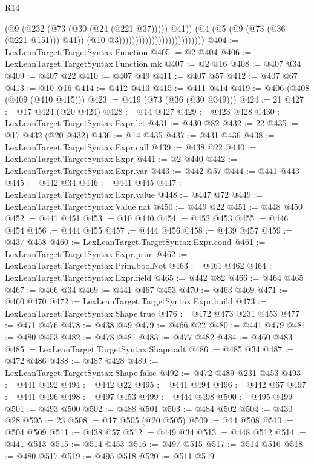 \begin{lexlean}{R14}
\begin{coremodule}
                                                      (@9 (@232 (@73 (@30 (@24 (@221 @37))))) @41))
                                                    (@4
                                                      (@5 (@9 (@73 (@36 (@221 @151))) @41))
                                                      (@10 @3))))))))))))))))))))))))))
@404 := LexLeanTarget.TargetSyntax.Function
@405 := @2 @404
@406 := LexLeanTarget.TargetSyntax.Function.mk
@407 := @2 @16
@408 := @407 @34
@409 := @407 @22
@410 := @407 @49
@411 := @407 @57
@412 := @407 @67
@413 := @10 @16
@414 := @412 @413
@415 := @411 @414
@419 := @406 (@408 (@409 (@410 @415)))
@423 := @419 (@73 (@36 (@30 @349)))
@424 := 21
@427 := @17 @424 (@20 @424)
@428 := @14 @427
@429 := @423 @428
@430 := LexLeanTarget.TargetSyntax.Expr.let
@431 := @430 @82
@432 := 22
@435 := @17 @432 (@20 @432)
@436 := @14 @435
@437 := @431 @436
@438 := LexLeanTarget.TargetSyntax.Expr.call
@439 := @438 @22
@440 := LexLeanTarget.TargetSyntax.Expr
@441 := @2 @440
@442 := LexLeanTarget.TargetSyntax.Expr.var
@443 := @442 @57
@444 := @441 @443
@445 := @442 @34
@446 := @441 @445
@447 := LexLeanTarget.TargetSyntax.Expr.value
@448 := @447 @72
@449 := LexLeanTarget.TargetSyntax.Value.nat
@450 := @449 @22
@451 := @448 @450
@452 := @441 @451
@453 := @10 @440
@454 := @452 @453
@455 := @446 @454
@456 := @444 @455
@457 := @444 @456
@458 := @439 @457
@459 := @437 @458
@460 := LexLeanTarget.TargetSyntax.Expr.cond
@461 := LexLeanTarget.TargetSyntax.Expr.prim
@462 := LexLeanTarget.TargetSyntax.Prim.boolNot
@463 := @461 @462
@464 := LexLeanTarget.TargetSyntax.Expr.field
@465 := @442 @82
@466 := @464 @465
@467 := @466 @34
@469 := @441 @467 @453
@470 := @463 @469
@471 := @460 @470
@472 := LexLeanTarget.TargetSyntax.Expr.build
@473 := LexLeanTarget.TargetSyntax.Shape.true
@476 := @472 @473 @231 @453
@477 := @471 @476
@478 := @438 @49
@479 := @466 @22
@480 := @441 @479
@481 := @480 @453
@482 := @478 @481
@483 := @477 @482
@484 := @460 @483
@485 := LexLeanTarget.TargetSyntax.Shape.adt
@486 := @485 @34
@487 := @472 @486
@488 := @487 @428
@489 := LexLeanTarget.TargetSyntax.Shape.false
@492 := @472 @489 @231 @453
@493 := @441 @492
@494 := @442 @22
@495 := @441 @494
@496 := @442 @67
@497 := @441 @496
@498 := @497 @453
@499 := @444 @498
@500 := @495 @499
@501 := @493 @500
@502 := @488 @501
@503 := @484 @502
@504 := @430 @28
@505 := 23
@508 := @17 @505 (@20 @505)
@509 := @14 @508
@510 := @504 @509
@511 := @438 @57
@512 := @449 @34
@513 := @448 @512
@514 := @441 @513
@515 := @514 @453
@516 := @497 @515
@517 := @514 @516
@518 := @480 @517
@519 := @495 @518
@520 := @511 @519

\end{coremodule}
\end{lexlean}
